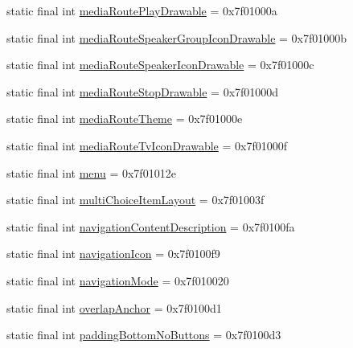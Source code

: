 \begin{CompactItemize}
\item 
static final int \hyperlink{classandroid_1_1support_1_1v7_1_1palette_1_1_r_1_1attr_361324bfaa709d146c4ccf9e143f46e4}{mediaRoutePlayDrawable} = 0x7f01000a
\item 
static final int \hyperlink{classandroid_1_1support_1_1v7_1_1palette_1_1_r_1_1attr_e9a40149cba6e973ec1ededecf1a29af}{mediaRouteSpeakerGroupIconDrawable} = 0x7f01000b
\item 
static final int \hyperlink{classandroid_1_1support_1_1v7_1_1palette_1_1_r_1_1attr_71ec7211dc018c1742b473169b5f4233}{mediaRouteSpeakerIconDrawable} = 0x7f01000c
\item 
static final int \hyperlink{classandroid_1_1support_1_1v7_1_1palette_1_1_r_1_1attr_548aa6cce3cd6b3be82193b5c6fc3d3a}{mediaRouteStopDrawable} = 0x7f01000d
\item 
static final int \hyperlink{classandroid_1_1support_1_1v7_1_1palette_1_1_r_1_1attr_343a413d628fc1ca9ba9c5177afe866f}{mediaRouteTheme} = 0x7f01000e
\item 
static final int \hyperlink{classandroid_1_1support_1_1v7_1_1palette_1_1_r_1_1attr_fb98a2f0635e193eb7fd1aed21081ba6}{mediaRouteTvIconDrawable} = 0x7f01000f
\item 
static final int \hyperlink{classandroid_1_1support_1_1v7_1_1palette_1_1_r_1_1attr_688b6779090f34e9f6965580ecb7ea16}{menu} = 0x7f01012e
\item 
static final int \hyperlink{classandroid_1_1support_1_1v7_1_1palette_1_1_r_1_1attr_5265c4e62f187e4d6115e42259ad5036}{multiChoiceItemLayout} = 0x7f01003f
\item 
static final int \hyperlink{classandroid_1_1support_1_1v7_1_1palette_1_1_r_1_1attr_e04bd5afc65c7d6e6ed09390d8282ffa}{navigationContentDescription} = 0x7f0100fa
\item 
static final int \hyperlink{classandroid_1_1support_1_1v7_1_1palette_1_1_r_1_1attr_69eb91991732d4e357c1e9bb08ca657f}{navigationIcon} = 0x7f0100f9
\item 
static final int \hyperlink{classandroid_1_1support_1_1v7_1_1palette_1_1_r_1_1attr_13d648640d6bfd7c6af5eb2a8ce67a38}{navigationMode} = 0x7f010020
\item 
static final int \hyperlink{classandroid_1_1support_1_1v7_1_1palette_1_1_r_1_1attr_af67e96ca112047bf98cb41a8e1da1e0}{overlapAnchor} = 0x7f0100d1
\item 
static final int \hyperlink{classandroid_1_1support_1_1v7_1_1palette_1_1_r_1_1attr_1661d191bde4a1782809ab4d3f68c638}{paddingBottomNoButtons} = 0x7f0100d3
\item 

\end{CompactItemize}
